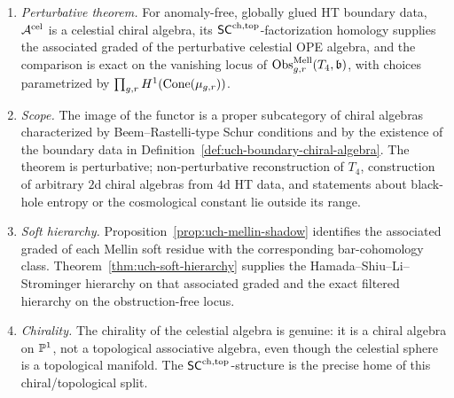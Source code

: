 \begin{enumerate}
\item \emph{Perturbative theorem.} For anomaly-free, globally glued
HT boundary data, $\mathcal A^{\mathrm{cel}}$ is a celestial chiral algebra,
its $\mathsf{SC}^{\mathrm{ch,top}}$-factorization homology supplies the associated graded
of the perturbative celestial OPE algebra, and the comparison is exact
on the vanishing locus of
$\operatorname{Obs}^{\mathrm{Mell}}_{g,r}(T_4,\mathfrak b)$, with choices
parametrized by \(\prod_{g,r}H^1(\operatorname{Cone}(\mu_{g,r}))\).

\item \emph{Scope.} The image of the functor is a proper
subcategory of chiral algebras characterized by
Beem--Rastelli-type Schur conditions and by the existence of the
boundary data in Definition~\ref{def:uch-boundary-chiral-algebra}.
The theorem is perturbative; non-perturbative reconstruction of $T_4$,
construction of arbitrary $2$d chiral algebras from $4$d HT data, and
statements about black-hole entropy or the cosmological constant lie
outside its range.

\item \emph{Soft hierarchy.} Proposition~\ref{prop:uch-mellin-shadow}
identifies the associated graded of each Mellin soft residue with the
corresponding bar-cohomology class. Theorem~\ref{thm:uch-soft-hierarchy}
supplies the Hamada--Shiu--Li--Strominger hierarchy on that associated
graded and the exact filtered hierarchy on the obstruction-free locus.

\item \emph{Chirality.} The chirality of the celestial
algebra is genuine: it is a chiral algebra on $\mathbb P^1$, not a
topological associative algebra, even though the celestial sphere is a
topological manifold. The $\mathsf{SC}^{\mathrm{ch,top}}$-structure is the precise home
of this chiral/topological split.
\end{enumerate}

